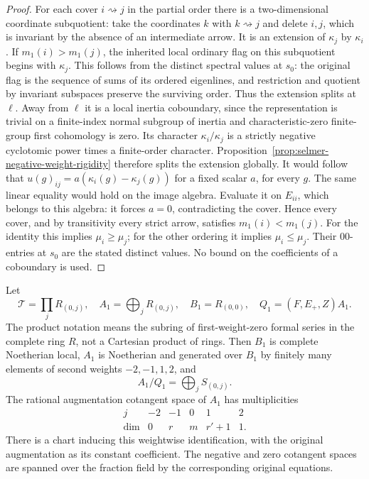 \begin{proof}
For each cover \(i\rightsquigarrow j\) in the partial order
there is a two-dimensional coordinate subquotient:
take the coordinates \(k\) with \(k\rightsquigarrow j\)
and delete
\(i,j\), which is invariant by the absence of an
intermediate arrow. It is an extension of \(\kappa_j\)
by \(\kappa_i\). If \(m_1(i)>m_1(j)\), the inherited local
ordinary flag on this subquotient begins with \(\kappa_j\).
This follows from the distinct spectral values at \(s_0\):
the original flag is the sequence of sums of its ordered
eigenlines, and restriction and quotient by invariant
subspaces preserve the surviving order. Thus the extension
splits at \(\ell\). Away from \(\ell\) it is a local
inertia coboundary, since the representation is trivial
on a finite-index normal subgroup of inertia and
characteristic-zero finite-group first cohomology is zero.
Its character \(\kappa_i/\kappa_j\) is a strictly negative
cyclotomic power times a finite-order character.
Proposition~\ref{prop:selmer-negative-weight-rigidity}
therefore splits the extension globally. It would follow
that \(u(g)_{ij}=a(\kappa_i(g)-\kappa_j(g))\) for a fixed
scalar \(a\), for every \(g\).
The same linear equality would hold on the image algebra.
Evaluate it on \(E_{ii}\), which belongs to this algebra:
it forces \(a=0\), contradicting the cover.
Hence every cover, and by transitivity every strict
arrow, satisfies \(m_1(i)<m_1(j)\).
For the identity this implies \(\mu_i\ge\mu_j\);
for the other ordering it implies \(\mu_i\le\mu_j\).
Their \(00\)-entries at \(s_0\) are the stated distinct
values. No bound on the coefficients of a coboundary
is used.
\end{proof}

\begin{lemma}
\label{lem:rh-sp4-slice}
Let
\[
 \mathscr T=\prod_{j} R_{(0,j)},\quad
 A_1=\bigoplus_j R_{(0,j)},\quad B_1=R_{(0,0)},\quad
 Q_1=(F,E_+,Z)A_1.
\]
The product notation means the subring of first-weight-zero
formal series in the complete ring \(R\), not a Cartesian
product of rings. Then \(B_1\) is complete Noetherian local,
\(A_1\) is Noetherian and generated over \(B_1\) by finitely
many elements of second weights \(-2,-1,1,2\), and
\[
                 A_1/Q_1=\bigoplus_j S_{(0,j)}.           \tag{SL1}
\]
The rational augmentation cotangent space of \(A_1\) has
multiplicities
\[
 \begin{array}{c|ccccc}
 j&-2&-1&0&1&2\\ \hline
 \dim&0&r&m&r'+1&1 .
 \end{array}                                               \tag{SL2}
\]
There is a chart inducing this weightwise identification,
with the original augmentation as its constant coefficient.
The negative and zero cotangent spaces are spanned over
the fraction field by the corresponding original equations.
\end{lemma}

